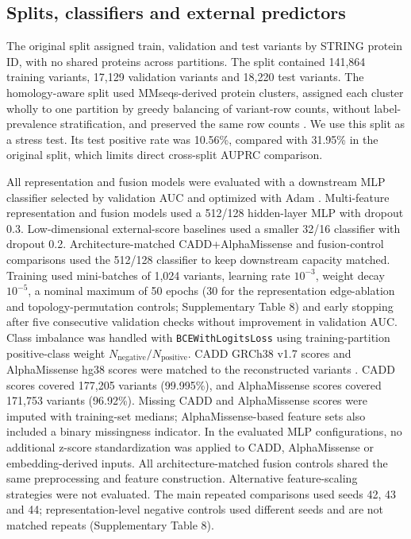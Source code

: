 \documentclass[conference]{IEEEtran}
\newcommand{\CADDAM}{CADD\allowbreak{}+\allowbreak{}AlphaMissense}
\begin{document}
\subsection{Splits, classifiers and external predictors}

The original split assigned train, validation and test variants by STRING protein ID, with no shared proteins across partitions. The split contained 141,864 training variants, 17,129 validation variants and 18,220 test variants. The homology-aware split used MMseqs-derived protein clusters, assigned each cluster wholly to one partition by greedy balancing of variant-row counts, without label-prevalence stratification, and preserved the same row counts \cite{Steinegger2017MMseqs2}. We use this split as a stress test. Its test positive rate was 10.56\%, compared with 31.95\% in the original split, which limits direct cross-split AUPRC comparison.

All representation and fusion models were evaluated with a downstream MLP classifier selected by validation AUC and optimized with Adam \cite{Kingma2015Adam}. Multi-feature representation and fusion models used a 512/128 hidden-layer MLP with dropout 0.3. Low-dimensional external-score baselines used a smaller 32/16 classifier with dropout 0.2. Architecture-matched \CADDAM{} and fusion-control comparisons used the 512/128 classifier to keep downstream capacity matched. Training used mini-batches of 1,024 variants, learning rate $10^{-3}$, weight decay $10^{-5}$, a nominal maximum of 50 epochs (30 for the representation edge-ablation and topology-permutation controls; Supplementary Table 8) and early stopping after five consecutive validation checks without improvement in validation AUC. Class imbalance was handled with \texttt{BCEWithLogitsLoss} using training-partition positive-class weight $N_{\mathrm{negative}}/N_{\mathrm{positive}}$. CADD GRCh38 v1.7 scores and AlphaMissense hg38 scores were matched to the reconstructed variants \cite{Kircher2014CADD,Schubach2024CADDv17,Cheng2023AlphaMissense}. CADD scores covered 177,205 variants (99.995\%), and AlphaMissense scores covered 171,753 variants (96.92\%). Missing CADD and AlphaMissense scores were imputed with training-set medians; AlphaMissense-based feature sets also included a binary missingness indicator. In the evaluated MLP configurations, no additional z-score standardization was applied to CADD, AlphaMissense or embedding-derived inputs. All architecture-matched fusion controls shared the same preprocessing and feature construction. Alternative feature-scaling strategies were not evaluated. The main repeated comparisons used seeds 42, 43 and 44; representation-level negative controls used different seeds and are not matched repeats (Supplementary Table 8).
\end{document}
